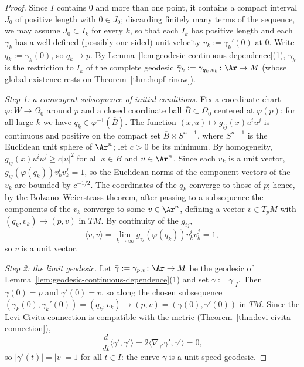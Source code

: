 \begin{proof}
\leanok
{}
Since $I$ contains $0$ and more than one point, it contains a compact
interval $J_0$ of positive length with $0\in J_0$; discarding
finitely many terms of the sequence, we may assume $J_0\subset I_k$
for every $k$, so that each $I_k$ has positive length and each
$\gamma_k$ has a well-defined (possibly one-sided) unit velocity
$v_k:=\gamma_k'(0)$ at $0$. Write $q_k:=\gamma_k(0)$, so $q_k\to p$.
By Lemma~\ref{lem:geodesic-continuous-dependence}(1), $\gamma_k$ is
the restriction to $I_k$ of the complete geodesic
$\bar\gamma_k:=\gamma_{q_k,v_k}\colon\Ar\to M$ (whose global
existence rests on Theorem~\ref{thm:hopf-rinow}).

{\em Step 1: a convergent subsequence of initial conditions.} Fix a
coordinate chart $\varphi\colon W\to\Omega_0$ around $p$ and a closed
coordinate ball $\overline{B}\subset\Omega_0$ centered at
$\varphi(p)$; for all large $k$ we have $q_k\in
\varphi^{-1}(\overline B)$. The function
$(x,u)\mapsto g_{ij}(x)u^iu^j$ is continuous and positive on the
compact set $\overline{B}\times S^{n-1}$, where $S^{n-1}$ is the
Euclidean unit sphere of $\Ar^n$; let $c>0$ be its minimum. By
homogeneity, $g_{ij}(x)u^iu^j\ge c|u|^2$ for all
$x\in\overline{B}$ and $u\in\Ar^n$. Since each $v_k$ is a unit
vector, $g_{ij}(\varphi(q_k))v_k^iv_k^j=1$, so the Euclidean norms of
the component vectors of the $v_k$ are bounded by $c^{-1/2}$. The
coordinates of the $q_k$ converge to those of $p$; hence, by the
Bolzano--Weierstrass theorem, after passing to a subsequence the
components of the $v_k$ converge to some $\bar v\in\Ar^n$, defining a
vector $v\in T_pM$ with $(q_k,v_k)\rightarrow(p,v)$ in $TM$. By
continuity of the $g_{ij}$,
$$\langle v,v\rangle
=\lim_{k\rightarrow\infty}g_{ij}(\varphi(q_k))v_k^iv_k^j=1,$$
so $v$ is a unit vector.

{\em Step 2: the limit geodesic.} Let
$\bar\gamma:=\gamma_{p,v}\colon\Ar\to M$ be the geodesic of
Lemma~\ref{lem:geodesic-continuous-dependence}(1) and set
$\gamma:=\bar\gamma|_I$. Then $\gamma(0)=p$ and $\gamma'(0)=v$, so
along the chosen subsequence
$(\gamma_k(0),\gamma_k'(0))=(q_k,v_k)\rightarrow(p,v)
=(\gamma(0),\gamma'(0))$ in $TM$. Since the Levi-Civita connection is
compatible with the metric (Theorem~\ref{thm:levi-civita-connection}),
$$\frac{d}{dt}\langle\bar\gamma',\bar\gamma'\rangle
=2\langle\nabla_{\bar\gamma'}\bar\gamma',\bar\gamma'\rangle=0,$$
so $|\gamma'(t)|=|v|=1$ for all $t\in I$: the curve $\gamma$ is a
unit-speed geodesic.


\end{proof}
